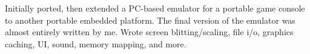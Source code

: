 {
  Initially ported, then extended a PC-based emulator for a portable game console to another portable embedded platform. The final version of the emulator was almost entirely written by me. Wrote screen blitting/scaling, file i/o, graphics caching, UI, sound, memory mapping, and more.
}
